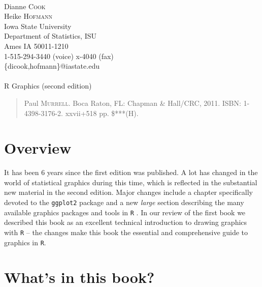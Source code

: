\documentclass[12pt]{article}
\begin{document}
\noindent [Reviewers]\\ 
Dianne \textsc{Cook} \\ 
Heike \textsc{Hofmann} \\ 
Iowa State University \\ 
Department of Statistics, ISU \\ 
Ames IA 50011-1210 \\ 
1-515-294-3440 (voice) x-4040 (fax) \\ 
\{dicook,hofmann\}@iastate.edu \\ 

\noindent [Book \#***]\\ 
{\Large\sf R Graphics (second edition)}
\begin{quotation}\noindent
 Paul \textsc{Murrell}.  
Boca Raton, FL: Chapman \& Hall/CRC, 2011.  ISBN: 1-4398-3176-2. xxvii+518 pp. \$***(H).  
\end{quotation}\vspace{12pt}

\setlength{\baselineskip}{20pt}

\section{Overview}

It has been 6 years since the first edition was published. A lot has
changed in the world of statistical graphics during this time, which
is reflected in the substantial new material in the second
edition. Major changes include a chapter specifically devoted to the
\texttt{ggplot2} package and a new {\em large} section describing the
many available graphics packages and tools in \texttt{R} \citep{R2011}.  In our
review of the first book we described this book as an excellent
technical introduction to drawing graphics with \texttt{R} -- the changes make
this book the essential and comprehensive guide to graphics in \texttt{R}.



\section{What's in this book?}
\end{document}
